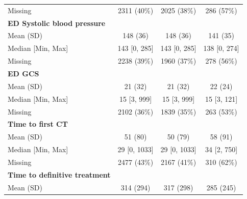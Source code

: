 \documentclass[12pt, a4paper]{article}
\begin{document}
\begin{appendices}
\begin{table}[t!]
{\begin{tabular}{lccc}
				\hspace{3mm}Missing                           & 2311 (40\%)       & 2025 (38\%)       & 286 (57\%)       \\
				\textbf{ED Systolic blood pressure}           &                   &                   &                  \\
				\hspace{3mm}Mean (SD)                         & 148 (36)          & 148 (36)          & 141 (35)         \\
				\hspace{3mm}Median [Min, Max]                 & 143 [0, 285]      & 143 [0, 285]      & 138 [0, 274]     \\
				\hspace{3mm}Missing                           & 2238 (39\%)       & 1960 (37\%)       & 278 (56\%)       \\
				\textbf{ED GCS}                               &                   &                   &                  \\
				\hspace{3mm}Mean (SD)                         & 21 (32)           & 21 (32)           & 22 (24)          \\
				\hspace{3mm}Median [Min, Max]                 & 15 [3, 999]       & 15 [3, 999]       & 15 [3, 121]      \\
				\hspace{3mm}Missing                           & 2102 (36\%)       & 1839 (35\%)       & 263 (53\%)       \\
				\textbf{Time to first CT}                     &                   &                   &                  \\
				\hspace{3mm}Mean (SD)                         & 51 (80)           & 50 (79)           & 58 (91)          \\
				\hspace{3mm}Median [Min, Max]                 & 29 [0, 1033]      & 29 [0, 1033]      & 34 [2, 750]      \\
				\hspace{3mm}Missing                           & 2477 (43\%)       & 2167 (41\%)       & 310 (62\%)       \\
				\textbf{Time to definitive treatment}         &                   &                   &                  \\
				\hspace{3mm}Mean (SD)                         & 314 (294)         & 317 (298)         & 285 (245)        \\

\end{tabular}}
\end{table}
\end{appendices}
\end{document}
